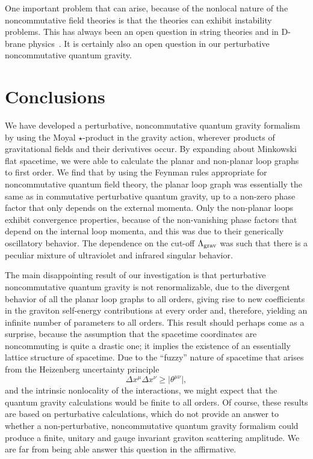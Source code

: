 \documentclass[a4paper,10pt]{article}
\begin{document}
One important problem that can arise, because
of the nonlocal nature of the noncommutative field theories is that
the theories can exhibit instability problems. This has
always been an open question in string theories and in D-brane
physics~\cite{Eliezer,Kamimura,Douglas}. It is certainly also an open question in
our perturbative noncommutative quantum gravity.

\section{\bf Conclusions}

We have developed a perturbative, noncommutative quantum gravity formalism
by using the Moyal $\star$-product in the gravity action, wherever products
of gravitational fields and their derivatives occur. By expanding about
Minkowski flat spacetime, we were able to calculate the planar and
non-planar loop graphs to first order. We find that by using the Feynman
rules appropriate for noncommutative quantum field theory, the planar
loop graph was essentially the same as in commutative perturbative quantum
gravity, up to a non-zero phase factor that only depends on the external
momenta. Only the non-planar loops exhibit convergence properties,
because of the non-vanishing phase factors that depend on the internal loop
momenta, and this was due to their generically oscillatory behavior. The
dependence on the cut-off $\Lambda_{\rm grav}$ was such that there is a
peculiar mixture of ultraviolet and infrared singular behavior.

The main disappointing result of our investigation is that perturbative
noncommutative quantum gravity is not renormalizable, due to the divergent
behavior of all the planar loop graphs to all orders, giving rise to new
coefficients in the graviton self-energy contributions at every order
and, therefore, yielding an infinite number of parameters to all orders. This
result should perhaps come as a surprise, because the assumption that the
spacetime coordinates are noncommuting is quite a drastic one; it
implies the existence of an essentially lattice structure of spacetime.
Due to the ``fuzzy'' nature of spacetime that arises from the Heizenberg
uncertainty principle
\begin{equation}
\Delta x^\mu\Delta x^\nu \ge \vert\theta^{\mu\nu}\vert,
\end{equation}
and the intrinsic nonlocality of the interactions, we might expect that the
quantum gravity calculations would be finite to all orders. Of course,
these results are based on perturbative calculations, which do not
provide an answer to whether a non-perturbative, noncommutative quantum
gravity formalism could produce a finite, unitary and gauge invariant
graviton scattering amplitude. We are far from being able answer this
question in the affirmative.
\end{document}
